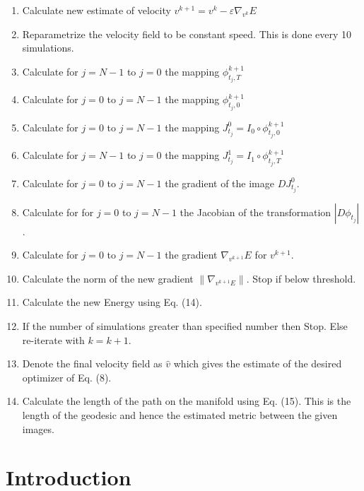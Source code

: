 \documentclass[final, paper=letter,5p,times,twocolumn]{elsarticle}
\theoremstyle{definition}
\begin{document}
\begin{enumerate}
\item Calculate new estimate of velocity $v^{k+1} = v^{k} - \varepsilon \nabla_{v^{k}} E$
\item Reparametrize the velocity field to be constant speed. This is done every 10 simulations.
\item Calculate for $j = N-1$ to $j = 0$ the mapping $\phi_{t_{j},T}^{k+1}$
\item Calculate for $j = 0$ to $j = N-1$ the mapping $\phi_{t_{j},0}^{k+1}$
\item Calculate for $j = 0$ to $j = N-1$ the mapping $J_{t_{j}}^{0} = I_{0} \circ \phi_{t_{j},0}^{k+1}$
\item Calculate for $j = N-1$ to $j = 0$ the mapping $J_{t_{j}}^{1} = I_{1} \circ \phi_{t_{j},T}^{k+1}$
\item Calculate for $j = 0$ to $j = N-1$ the gradient of the image $DJ_{t_{j}}^{0}$.
\item Calculate for for $j = 0$ to $j = N-1$ the Jacobian of the transformation $|D \phi_{t_{j}}|$.
\item Calculate for $j = 0$ to $j = N-1$ the gradient $\nabla_{v^{k+1}}E$ for $v^{k+1}$.
\item Calculate the norm of the new gradient $\| \nabla_{v^{k+1}E} \|$. Stop if below threshold.
\item Calculate the new Energy using Eq. (14).
\item If the number of simulations greater than specified number then Stop. Else re-iterate with $k = k +1.$
\item Denote the final velocity field as $\hat{v}$ which gives the estimate of the desired optimizer of Eq. (8).
\item Calculate the length of the path on the manifold using Eq. (15). This is the length of the geodesic and hence the estimated metric between the given images.
\end{enumerate}



\section{Introduction}
\end{document}
